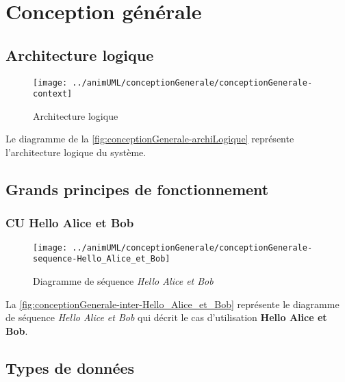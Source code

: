 
\section{Conception générale}

\newcommand\macroSuffix{}



\subsection{Architecture logique}

\begin{figure}[H]
	\centering
	\texttt{[image: ../animUML/conceptionGenerale/conceptionGenerale-context]}
	\caption{Architecture logique}
	\label{fig:conceptionGenerale-archiLogique}
\end{figure}
Le diagramme de la \autoref{fig:conceptionGenerale-archiLogique} représente l'architecture logique du système.


\subsection{Grands principes de fonctionnement}


\subsubsection{CU Hello Alice et Bob}
\begin{figure}[H]
	\centering
	\texttt{[image: ../animUML/conceptionGenerale/conceptionGenerale-sequence-Hello\_Alice\_et\_Bob]}
	\caption{Diagramme de séquence \emph{Hello Alice et Bob}}
	\label{fig:conceptionGenerale-inter-Hello_Alice_et_Bob}
\end{figure}
La \autoref{fig:conceptionGenerale-inter-Hello_Alice_et_Bob} représente le diagramme de séquence \emph{Hello Alice et Bob} 
                qui décrit le cas d'utilisation \textbf{Hello Alice et Bob}.



\subsection{Types de données}
